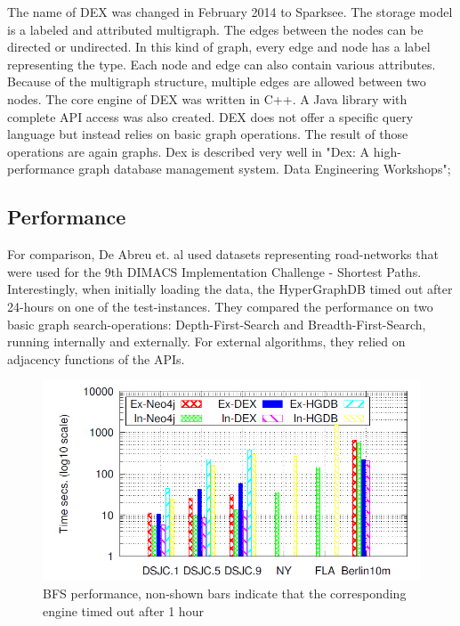 \documentclass{acm_proc_article-sp}
\begin{document}
The name of DEX was changed in February 2014 to Sparksee. The storage model is a labeled and attributed multigraph. The edges between the nodes can be directed or undirected. In this kind of graph, every edge and node has a label representing the type. Each node and edge can also contain various attributes. Because of the multigraph structure, multiple edges are allowed between two nodes. The core engine of DEX was written in C++. A Java library with complete API access was also created. DEX does not offer a specific query language but instead relies on basic graph operations. The result of those operations are again graphs. Dex is described very well in "Dex: A high-performance graph database management
system. Data Engineering Workshops"\cite{dex};

\subsection{Performance}

For comparison, De Abreu et. al used datasets representing road-networks that were used for the 9th DIMACS Implementation Challenge - Shortest Paths\cite{comparision}. Interestingly, when initially loading the data, the HyperGraphDB timed out after 24-hours on one of the test-instances.
They compared the performance on two basic graph search-operations: Depth-First-Search and Breadth-First-Search, running internally and externally. For external algorithms, they relied on adjacency functions of the APIs.

\begin{figure}[hbtp]
	\centering
	\includegraphics[scale=0.32]{bfs.png}
	\caption{BFS performance, non-shown bars indicate that
		the corresponding engine timed out after 1 hour\cite{comparision}}
\end{figure}
\end{document}
